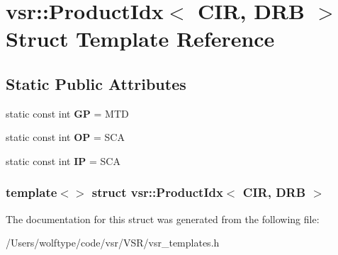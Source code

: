 \hypertarget{structvsr_1_1_product_idx_3_01_c_i_r_00_01_d_r_b_01_4}{\section{vsr\-:\-:Product\-Idx$<$ C\-I\-R, D\-R\-B $>$ Struct Template Reference}
\label{structvsr_1_1_product_idx_3_01_c_i_r_00_01_d_r_b_01_4}
}
\subsection*{Static Public Attributes}
\begin{DoxyCompactItemize}
\item 
\hypertarget{structvsr_1_1_product_idx_3_01_c_i_r_00_01_d_r_b_01_4_a8f23cd153cd2380df62bb2673223d96b}{static const int {\bfseries G\-P} = M\-T\-D}\label{structvsr_1_1_product_idx_3_01_c_i_r_00_01_d_r_b_01_4_a8f23cd153cd2380df62bb2673223d96b}

\item 
\hypertarget{structvsr_1_1_product_idx_3_01_c_i_r_00_01_d_r_b_01_4_afd6dcb23f14da1747e9c0ddc5124d2be}{static const int {\bfseries O\-P} = S\-C\-A}\label{structvsr_1_1_product_idx_3_01_c_i_r_00_01_d_r_b_01_4_afd6dcb23f14da1747e9c0ddc5124d2be}

\item 
\hypertarget{structvsr_1_1_product_idx_3_01_c_i_r_00_01_d_r_b_01_4_ab666bf9d706de4aff87d556e443b13af}{static const int {\bfseries I\-P} = S\-C\-A}\label{structvsr_1_1_product_idx_3_01_c_i_r_00_01_d_r_b_01_4_ab666bf9d706de4aff87d556e443b13af}

\end{DoxyCompactItemize}
\subsubsection*{template$<$$>$ struct vsr\-::\-Product\-Idx$<$ C\-I\-R, D\-R\-B $>$}



The documentation for this struct was generated from the following file\-:\begin{DoxyCompactItemize}
\item 
/\-Users/wolftype/code/vsr/\-V\-S\-R/vsr\-\_\-templates.\-h\end{DoxyCompactItemize}
